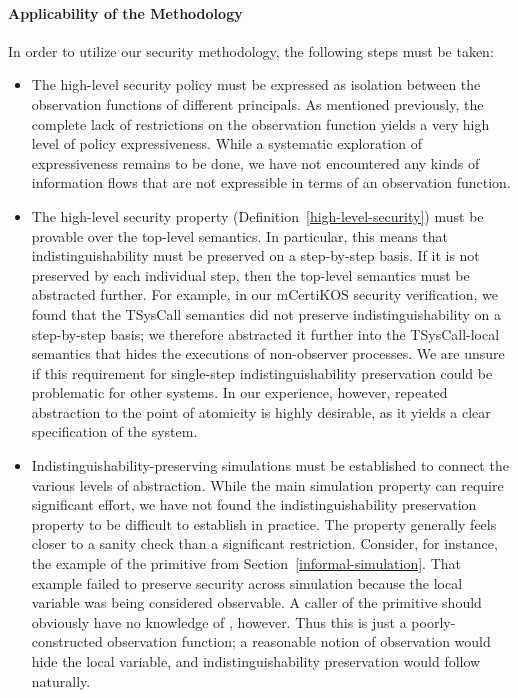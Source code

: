 \paragraph{Applicability of the Methodology}
In order to utilize our security methodology, the following steps must be taken:
\begin{itemize}
\item The high-level security policy must be expressed as isolation
  between the observation functions of different principals. As
  mentioned previously, the complete lack of restrictions on the
  observation function yields a very high level of policy
  expressiveness. While a systematic exploration of expressiveness
  remains to be done, we have not encountered any kinds of information
  flows that are %
  not expressible in terms of an observation function.

\item The high-level security property
  (Definition~\ref{high-level-security}) must be provable over the
  top-level semantics. In particular, this means that
  indistinguishability must be preserved on a step-by-step basis. If
  it is not preserved by each individual step, then the top-level
  semantics must be abstracted further. For example, in our mCertiKOS
  security verification, we found that the TSysCall semantics did not
  preserve indistinguishability on a step-by-step basis; we therefore
  abstracted it further into the TSysCall-local semantics that hides
  the executions of non-observer processes.  We are unsure if this
  requirement for single-step indistinguishability preservation could
  be problematic for other systems. In our experience, however,
  repeated abstraction to the point of atomicity is highly desirable,
  as it yields a clear specification of the system.

\item Indistinguishability-preserving simulations must be established
  to connect the various levels of abstraction. While the main
  simulation property can require significant effort, we have not
  found the indistinguishability preservation property to be difficult
  to establish in practice. The property generally feels closer to a
  sanity check than a significant restriction. Consider, for instance,
  the example of the  primitive from
  Section~\ref{informal-simulation}.  That example failed to preserve
  security across simulation because the local variable  was
  being considered observable. A caller of the  primitive
  should obviously have no knowledge of , however. Thus this is just a
  poorly-constructed observation function; a reasonable notion of
  observation would hide the local variable, and indistinguishability
  preservation would follow naturally.
\end{itemize}

